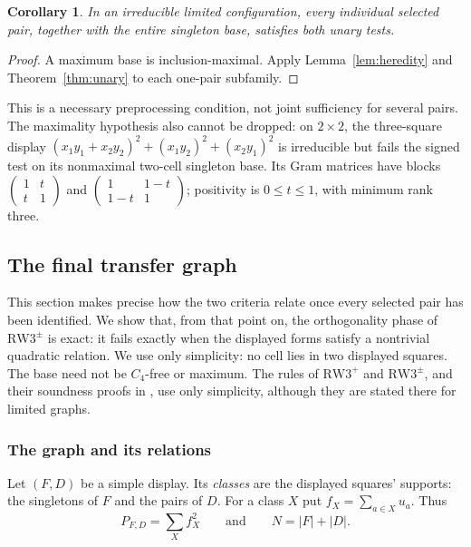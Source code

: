 \documentclass[11pt,a4paper]{article}
\newtheorem{corollary}[theorem]{Corollary}
\theoremstyle{definition}
\newcommand{\RW}{\mathrm{RW3}^{+}}
\newcommand{\SG}{\mathrm{RW3}^{\pm}}
\begin{document}
\begin{corollary}\label{cor:unaryfilter}
In an irreducible limited configuration, every individual selected pair,
together with the entire singleton base, satisfies both unary tests.
\end{corollary}
\begin{proof}
A maximum base is inclusion-maximal. Apply Lemma~\ref{lem:heredity}
and Theorem~\ref{thm:unary} to each one-pair subfamily.
\end{proof}
This is a necessary preprocessing condition, not joint sufficiency for
several pairs. The maximality hypothesis also cannot be dropped: on
$2\times2$, the three-square display
$(x_1y_1+x_2y_2)^2+(x_1y_2)^2+(x_2y_1)^2$ is irreducible but fails the
signed test on its nonmaximal two-cell singleton base. Its Gram matrices
have blocks $\left(\begin{smallmatrix}1&t\\t&1\end{smallmatrix}\right)$
and $\left(\begin{smallmatrix}1&1-t\\1-t&1\end{smallmatrix}\right)$;
positivity is $0\le t\le1$, with minimum rank three.

\subsection{The final transfer graph}\label{sec:transfer-graph}

This section makes precise how the two criteria relate once every selected
pair has been identified. We show that, from that point on, the orthogonality
phase of $\SG$ is exact: it fails exactly when the displayed forms satisfy a
nontrivial quadratic relation. We use only simplicity: no cell lies in two
displayed squares. The base need not be $C_4$-free or maximum. The rules of
$\RW$ and $\SG$, and their soundness proofs in \cite{LQ}, use only
simplicity, although they are stated there for limited graphs.

\subsubsection{The graph and its relations}

Let $(F,D)$ be a simple display. Its \emph{classes} are the displayed
squares' supports: the singletons of $F$ and the pairs of $D$. For a
class $X$ put $f_X=\sum_{a\in X}u_a$. Thus
\[
 P_{F,D}=\sum_X f_X^2 \qquad\text{and}\qquad N=|F|+|D|.
\]
\end{document}
